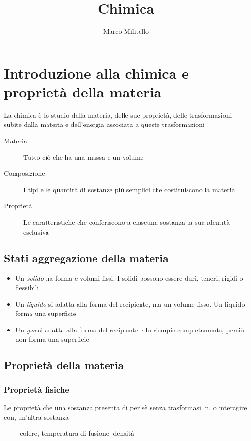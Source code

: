 \documentclass[a4paper,11pt]{report}
\begin{document}
	\date{}
	\author{Marco Militello}
	\title{Chimica}
	\maketitle
	\tableofcontents
	\newpage
	
\chapter{Introduzione alla chimica e proprietà della materia}
La chimica è lo studio della materia, delle sue proprietà, delle trasformazioni subite dalla materia e dell'energia associata a queste trasformazioni
\begin{description}
	\item[Materia] Tutto ciò che ha una massa e un volume
	\item[Composizione] I tipi e le quantità di sostanze più semplici che costituiscono la materia
	\item[Proprietà] Le caratteristiche che conferiscono a ciascuna sostanza la sua identità esclusiva 
\end{description}
\section{Stati aggregazione della materia}
\begin{itemize}
	\item Un \emph{solido} ha forma e volumi fissi. I solidi possono essere duri, teneri, rigidi o flessibili
	\item Un \emph{liquido} si adatta alla forma del recipiente, ma un volume fisso. Un liquido forma una superficie
	\item Un \emph{gas} si adatta alla forma del recipiente e lo riempie completamente, perciò non forma una superficie
\end{itemize}
\section{Proprietà della materia}
\subsection*{Proprietà fisiche}
Le proprietà che una sostanza presenta di per sè senza trasformasi in, o interagire con, un'altra sostanza
\begin{itemize}
	\item[-] colore, temperatura di fusione, densità
\end{itemize}
\end{document}
